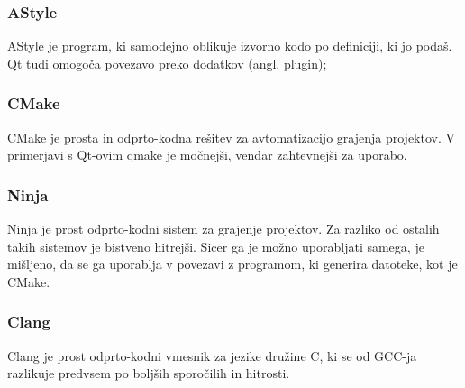 \documentclass[12pt,titlepage]{report}
\newcommand{\codequote}[1]{\textquote{\texttt{#1}}}
\begin{document}
			\subsubsection{AStyle\cite{astyle}}
				AStyle je program, ki samodejno oblikuje izvorno kodo po definiciji, ki jo podaš.
				Qt tudi omogoča povezavo preko dodatkov (angl. plugin);
			\subsubsection{CMake\cite{cmake}}
				CMake je prosta in odprto-kodna rešitev za avtomatizacijo grajenja projektov.
				V primerjavi s Qt-ovim qmake je močnejši, vendar zahtevnejši za uporabo.
			\subsubsection{Ninja\cite{ninja}}
				Ninja je prost odprto-kodni sistem za grajenje projektov.
				Za razliko od ostalih takih sistemov je bistveno hitrejši.
				Sicer ga je možno uporabljati samega, je mišljeno, da se ga uporablja v povezavi z programom, ki generira \codequote{.ninja} datoteke, kot je CMake.
			\subsubsection{Clang\cite{clang}}
				Clang je prost odprto-kodni vmesnik za jezike družine C, ki se od GCC-ja razlikuje predvsem po boljših sporočilih in hitrosti.
\end{document}
